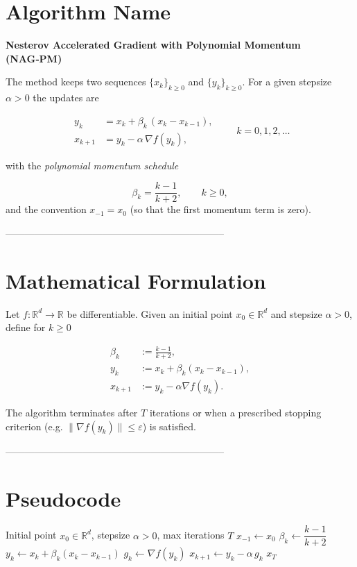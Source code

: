 \documentclass[11pt]{article}
\newcommand{\R}{\mathbb{R}}
\begin{document}
\section*{Algorithm Name}
\textbf{Nesterov Accelerated Gradient with Polynomial Momentum (NAG‑PM)}  

The method keeps two sequences $\{x_k\}_{k\ge 0}$ and $\{y_k\}_{k\ge 0}$.
For a given stepsize $\alpha>0$ the updates are  

\[
\boxed{
\begin{aligned}
y_k &= x_k + \beta_k\,(x_k-x_{k-1}),\\[2mm]
x_{k+1} &= y_k - \alpha \,\nabla f(y_k),
\end{aligned}}
\qquad k=0,1,2,\dots
\]

with the \emph{polynomial momentum schedule}

\[
\beta_k = \frac{k-1}{k+2},\qquad k\ge 0,
\]
and the convention $x_{-1}=x_0$ (so that the first momentum term is zero).

--------------------------------------------------------------------

\section*{Mathematical Formulation}
Let $f:\R^{d}\rightarrow\R$ be differentiable.  
Given an initial point $x_0\in\R^{d}$ and stepsize $\alpha>0$, define for $k\ge 0$

\begin{align}
\beta_k &:= \frac{k-1}{k+2}, \label{eq:beta}\\
y_k    &:= x_k + \beta_k (x_k-x_{k-1}), \label{eq:y}\\
x_{k+1}&:= y_k - \alpha \nabla f(y_k). \label{eq:x}
\end{align}

The algorithm terminates after $T$ iterations or when a prescribed stopping
criterion (e.g. $\|\nabla f(y_k)\|\le\varepsilon$) is satisfied.

--------------------------------------------------------------------

\section*{Pseudocode}
\begin{algorithm}[H]
\caption{NAG‑PM}
\begin{algorithmic}[1]
\Require Initial point $x_0\in\R^{d}$, stepsize $\alpha>0$, max iterations $T$
\State $x_{-1}\gets x_0$ 
    \State $\beta_k \gets \dfrac{k-1}{k+2}$ 
    \State $y_k \gets x_k + \beta_k (x_k - x_{k-1})$ 
    \State $g_k \gets \nabla f(y_k)$ 
    \State $x_{k+1} \gets y_k - \alpha\, g_k$ 
\EndFor
\State \Return $x_T$
\end{algorithmic}
\end{algorithm}
\end{document}

